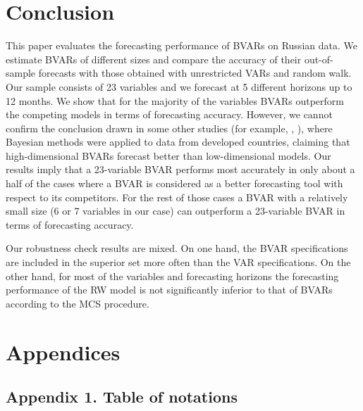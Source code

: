 \documentclass[11pt]{article} %
\begin{document}
\section{Conclusion}

This paper evaluates the forecasting performance of BVARs on Russian data. We estimate BVARs of different sizes and compare the accuracy of their out-of-sample forecasts with those obtained with unrestricted VARs and random walk.   Our sample consists of 23 variables and we forecast at 5 different horizons up to 12 months. We show that for the majority of the variables  BVARs  outperform the competing models in terms of forecasting accuracy.
However, we cannot confirm the conclusion drawn in some other studies (for example, \cite{bloor_matheson_2010}, \cite{banbura_al_2010}), where Bayesian methods were applied to data from developed countries, claiming that high-dimensional BVARs forecast better than low-dimensional models. Our results imply that a 23-variable BVAR performs most accurately in only about a half of the cases where a BVAR is considered as a better forecasting tool with respect to its competitors. For the rest of those cases a BVAR with a relatively small size (6 or 7 variables in our case)  can outperform a 23-variable BVAR in terms of forecasting accuracy.

Our robustness check results are mixed. On one hand, the BVAR specifications are included in the superior set more often than the VAR specifications. On the other hand, for most of the variables and forecasting horizons the forecasting performance of the RW model is not significantly inferior to that of BVARs according to the MCS procedure.


\newpage

\printbibliography

\newpage


\section*{Appendices}


\subsection*{Appendix 1. Table of notations}
\end{document}
